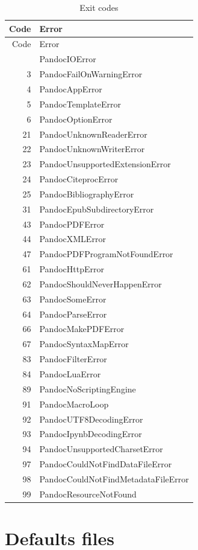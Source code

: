 \documentclass[
  b5paper
]{book}
\begin{document}
\begin{longtable}[]{@{}rl@{}}
\caption{\label{tbl:exit-codes}Exit codes}\tabularnewline
\toprule\noalign{}
Code & Error \\
\midrule\noalign{}
\endfirsthead
\toprule\noalign{}
Code & Error \\
\midrule\noalign{}
\endhead
\bottomrule\noalign{}
\endlastfoot
1 & PandocIOError \\
3 & PandocFailOnWarningError \\
4 & PandocAppError \\
5 & PandocTemplateError \\
6 & PandocOptionError \\
21 & PandocUnknownReaderError \\
22 & PandocUnknownWriterError \\
23 & PandocUnsupportedExtensionError \\
24 & PandocCiteprocError \\
25 & PandocBibliographyError \\
31 & PandocEpubSubdirectoryError \\
43 & PandocPDFError \\
44 & PandocXMLError \\
47 & PandocPDFProgramNotFoundError \\
61 & PandocHttpError \\
62 & PandocShouldNeverHappenError \\
63 & PandocSomeError \\
64 & PandocParseError \\
66 & PandocMakePDFError \\
67 & PandocSyntaxMapError \\
83 & PandocFilterError \\
84 & PandocLuaError \\
89 & PandocNoScriptingEngine \\
91 & PandocMacroLoop \\
92 & PandocUTF8DecodingError \\
93 & PandocIpynbDecodingError \\
94 & PandocUnsupportedCharsetError \\
97 & PandocCouldNotFindDataFileError \\
98 & PandocCouldNotFindMetadataFileError \\
99 & PandocResourceNotFound \\
\end{longtable}

\chapter{Defaults files}\label{defaults-files}
\end{document}
